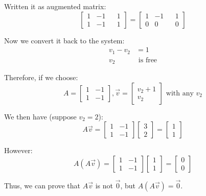 \documentclass[10pt]{article}
\begin{document}
\noindent Written it as augmented matrix:
\begin{equation*}
    \begin{bmatrix}
        1 & -1 && 1 \\
        1 & -1 && 1
    \end{bmatrix}
    =
    \begin{bmatrix}
        1 & -1 && 1 \\
        0 & 0 && 0
    \end{bmatrix}
\end{equation*}

\noindent Now we convert it back to the system:
\begin{align*}
    v_1 - v_2 &= 1 \\
    v_2 &\text{ is free}
\end{align*}

\noindent Therefore, if we choose:
\begin{equation*}
    A = 
    \begin{bmatrix}
        1 & -1 \\
        1 & -1
    \end{bmatrix},
    \Vec{v} = 
    \begin{bmatrix}
        v_2 + 1 \\
        v_2
    \end{bmatrix}
    \text{ with any $v_2$}
\end{equation*}

\noindent We then have (suppose $v_2 = 2$):
\begin{equation*}
    A\Vec{v} = 
    \begin{bmatrix}
        1 & -1 \\
        1 & -1
    \end{bmatrix}
    \begin{bmatrix}
        3 \\
        2
    \end{bmatrix}
    =
    \begin{bmatrix}
        1 \\
        1
    \end{bmatrix}
\end{equation*}

\noindent However:
\begin{equation*}
    A(A\Vec{v}) =
    \begin{bmatrix}
        1 & -1 \\
        1 & -1
    \end{bmatrix}
    \begin{bmatrix}
        1 \\
        1
    \end{bmatrix}
    =
    \begin{bmatrix}
        0 \\
        0
    \end{bmatrix}
\end{equation*}\par
\bigskip
\noindent Thus, we can prove that $A\Vec{v}$ is not $\Vec{0}$, but $A(A\Vec{v}) = \Vec{0}$.
\end{document}
